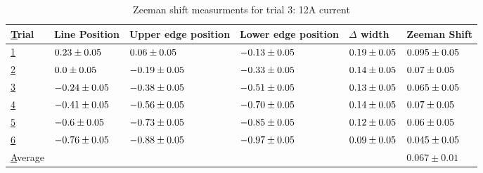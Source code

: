 \begin{table}[H]
    \begin{adjustwidth}{-100pt}{-100pt}
        \centering
        \begin{tabular}{|l|l|l|l|l|l|}
            \hline
            {\ul Trial}   & Line Position                & Upper edge position          & Lower edge position          & $\Delta$ width              & Zeeman Shift                 \\ \hline
            {\ul 1}       & $0.23 \pm 0.05$  & $0.06 \pm 0.05$  & $-0.13 \pm 0.05$ & $0.19 \pm 0.05$ & $0.095 \pm 0.05$ \\ \hline
            {\ul 2}       & $0.0 \pm 0.05$   & $-0.19 \pm 0.05$ & $-0.33 \pm 0.05$ & $0.14 \pm 0.05$ & $0.07 \pm 0.05$  \\ \hline
            {\ul 3}       & $-0.24 \pm 0.05$ & $-0.38 \pm 0.05$ & $-0.51 \pm 0.05$ & $0.13 \pm 0.05$ & $0.065 \pm 0.05$ \\ \hline
            {\ul 4}       & $-0.41 \pm 0.05$ & $-0.56 \pm 0.05$ & $-0.70 \pm 0.05$ & $0.14 \pm 0.05$ & $0.07 \pm 0.05$  \\ \hline
            {\ul 5}       & $-0.6 \pm 0.05$  & $-0.73 \pm 0.05$ & $-0.85 \pm 0.05$ & $0.12 \pm 0.05$ & $0.06 \pm 0.05$  \\ \hline
            {\ul 6}       & $-0.76 \pm 0.05$ & $-0.88 \pm 0.05$ & $-0.97 \pm 0.05$ & $0.09 \pm 0.05$ & $0.045 \pm 0.05$ \\ \hline
            {\ul Average} &                              &                              &                              &                             & $0.067 \pm 0.01$             \\ \hline
        \end{tabular}
    \end{adjustwidth}

    \caption{Zeeman shift measurments for trial 3: 12A current}

\end{table}


